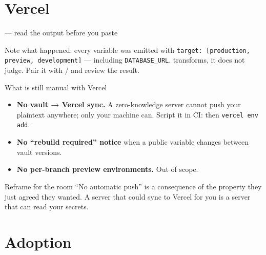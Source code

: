 \documentclass[aspectratio=169,10pt]{beamer}
\begin{document}
\section{Vercel}

\begin{frame}[fragile]{ --- read the output before you paste}

  \vspace{0.3em}
  {\footnotesize Note what happened: every variable was emitted with
  \texttt{target: [production, preview, development]} --- including
  \texttt{DATABASE\_URL}.  transforms, it does not judge. Pair it
  with  /  and review the result.}
\end{frame}

\begin{frame}{What is still manual with Vercel}
  \small
  \begin{itemize}
    \item \textbf{No vault → Vercel sync.} A zero-knowledge server cannot push
          your plaintext anywhere; only your machine can. Script it in CI:
           then \texttt{vercel env add}.
    \item \textbf{No ``rebuild required'' notice} when a public variable changes
          between vault versions.
    \item \textbf{No per-branch preview environments.} Out of scope.
  \end{itemize}

  \vspace{0.8em}
  \begin{block}{Reframe for the room}
    ``No automatic push'' is a consequence of the property they just agreed
    they wanted. A server that could sync to Vercel for you is a server that
    can read your secrets.
  \end{block}
\end{frame}

\section{Adoption}
\end{document}
